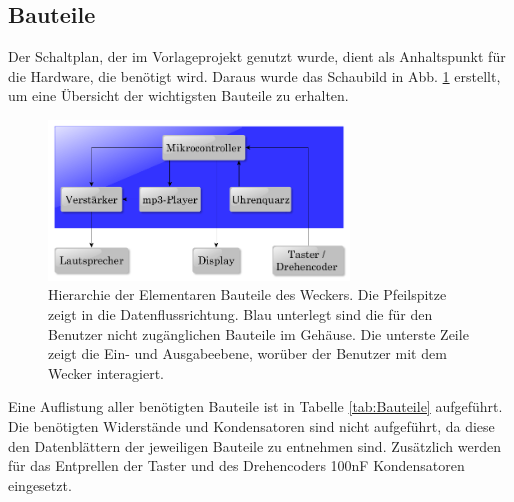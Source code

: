 \documentclass[journal, a4paper]{IEEEtran}
\begin{document}
	\subsection{Bauteile}
		\label{sc:Hardware:subsc:Bauteile}
		Der Schaltplan, der im Vorlageprojekt genutzt wurde, dient als Anhaltspunkt für die Hardware, die benötigt wird. Daraus wurde das Schaubild in Abb. \ref{fig:Hierarchie} erstellt, um eine Übersicht der wichtigsten Bauteile zu erhalten.
		\begin{figure}
				\includegraphics[width=80mm]{./Grafiken/Hierarchie}
				\caption{Hierarchie der Elementaren Bauteile des Weckers. Die Pfeilspitze zeigt in die Datenflussrichtung. Blau unterlegt sind die für den Benutzer nicht zugänglichen Bauteile im Gehäuse. Die unterste Zeile zeigt die Ein- und Ausgabeebene, worüber der Benutzer mit dem Wecker interagiert.}
				\label{fig:Hierarchie}
		\end{figure} 
		Eine Auflistung aller benötigten Bauteile ist in Tabelle \ref{tab:Bauteile} aufgeführt. Die benötigten Widerstände und Kondensatoren sind nicht aufgeführt, da diese den Datenblättern der jeweiligen Bauteile zu entnehmen sind. Zusätzlich werden für das Entprellen der Taster und des Drehencoders 100nF Kondensatoren eingesetzt.
\end{document}
